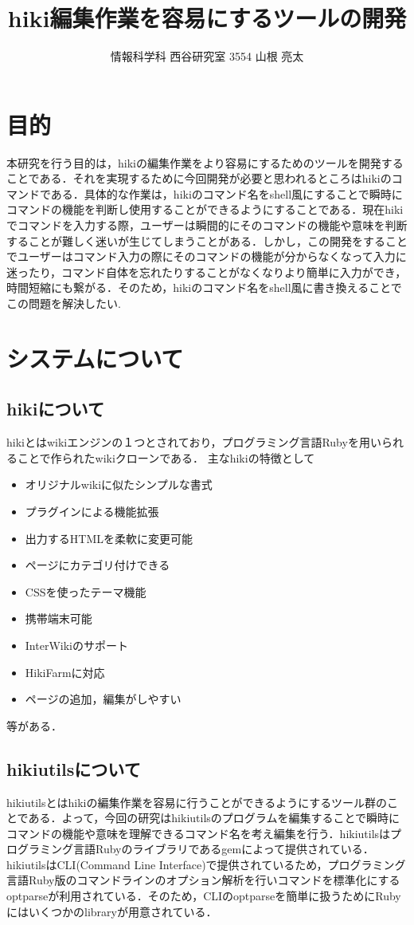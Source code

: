 \documentclass[a4j,twocolumn]{jsarticle}
\begin{document}
\title{hiki編集作業を容易にするツールの開発}
\author{情報科学科 西谷研究室 3554 山根 亮太}
\date{}
\maketitle
\section{目的}
本研究を行う目的は，hikiの編集作業をより容易にするためのツールを開発することである．それを実現するために今回開発が必要と思われるところはhikiのコマンドである．具体的な作業は，hikiのコマンド名をshell風にすることで瞬時にコマンドの機能を判断し使用することができるようにすることである．現在hikiでコマンドを入力する際，ユーザーは瞬間的にそのコマンドの機能や意味を判断することが難しく迷いが生じてしまうことがある．しかし，この開発をすることでユーザーはコマンド入力の際にそのコマンドの機能が分からなくなって入力に迷ったり，コマンド自体を忘れたりすることがなくなりより簡単に入力ができ，時間短縮にも繋がる．そのため，hikiのコマンド名をshell風に書き換えることでこの問題を解決したい.

\section{システムについて}
\subsection{hikiについて}
hikiとはwikiエンジンの１つとされており，プログラミング言語Rubyを用いられることで作られたwikiクローンである．
主なhikiの特徴として
\begin{itemize}
\item オリジナルwikiに似たシンプルな書式
\item プラグインによる機能拡張
\item 出力するHTMLを柔軟に変更可能
\item ページにカテゴリ付けできる
\item CSSを使ったテーマ機能
\item 携帯端末可能
\item InterWikiのサポート
\item HikiFarmに対応
\item ページの追加，編集がしやすい
\end{itemize}
等がある．\cite{hiki}


\subsection{hikiutilsについて}
hikiutilsとはhikiの編集作業を容易に行うことができるようにするツール群のことである．よって，今回の研究はhikiutilsのプログラムを編集することで瞬時にコマンドの機能や意味を理解できるコマンド名を考え編集を行う．hikiutilsはプログラミング言語Rubyのライブラリであるgemによって提供されている．\cite{gem}hikiutilsはCLI(Command Line Interface)で提供されているため，プログラミング言語Ruby版のコマンドラインのオプション解析を行いコマンドを標準化にするoptparseが利用されている．\cite{opt}そのため，CLIのoptparseを簡単に扱うためにRubyにはいくつかのlibraryが用意されている．
\end{document}
